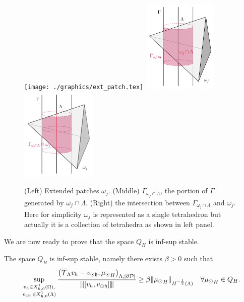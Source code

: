 \documentclass[r]{siamart171218}
\begin{document}
\begin{figure}\label{fig:gamma_generated}
\centering
\texttt{[image: ./graphics/ext\_patch.tex]}
\includegraphics[width=0.32\textwidth]{./graphics/gamma_generated}
\includegraphics[width=0.32\textwidth]{./graphics/intersection}
\caption{
(Left) Extended patches $\omega_j$. (Middle)
$\Gamma_{\omega_j \cap \Lambda}$, the portion of $\Gamma$ generated by $\omega_j \cap \Lambda$. (Right) the intersection between $\Gamma_{\omega_j \cap \Lambda}$ and $\omega_j$. Here for simplicity $\omega_j$ is represented as a single tetrahedron but actually it is a collection of tetrahedra as shown in left panel.}
\end{figure}

We are now ready to prove that the space $Q_H$ is inf-sup stable. 
\begin{lemma}\label{lemma:Lh_infsup}
The space $Q_H$ is inf-sup stable, 
namely there exists $\beta >0$ such that
\begin{equation*}
\sup_{\substack{v_h \in X_{h,0}^1(\Omega),\\ v_{\odot \mathfrak{h}} \in X_{\mathfrak{h},0}^1(\Lambda)}} \frac{\left({\overline{\mathcal{T}}_\Lambda} v_h - v_{\odot \mathfrak{h}}, {\mu_{\odot}} _H\right)_{\Lambda, |\partial\mathcal{D}|}}{{\left\vert\kern-0.25ex\left\vert\kern-0.25ex\left\vert [v_h, v_{\odot \mathfrak{h}}] \right\vert\kern-0.25ex\right\vert\kern-0.25ex\right\vert}} \geq \beta \|{\mu_{\odot}}_H\|_{H^{-\frac 12}(\Lambda)} \quad \forall {\mu_{\odot}}_H \in Q_H.
\end{equation*} 
\end{lemma}
\end{document}
